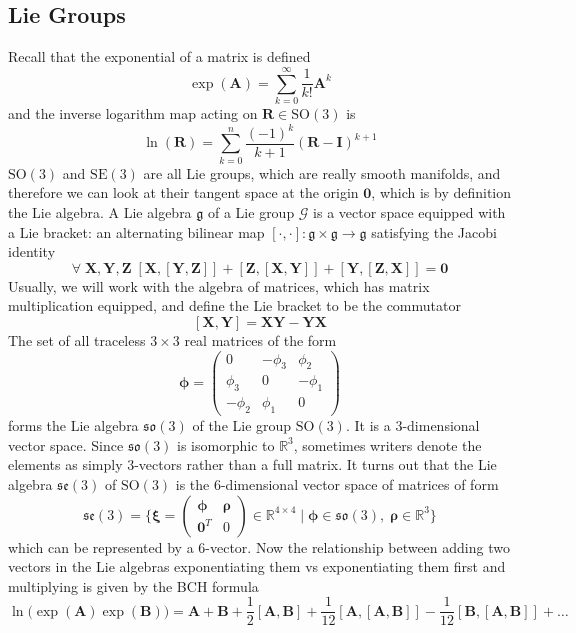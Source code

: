 \documentclass{article}
\theoremstyle{definition}
\theoremstyle{remark}
\theoremstyle{definition}
\begin{document}
\subsection{Lie Groups}

Recall that the exponential of a matrix is defined 
\[\exp(\mathbf{A}) = \sum_{k=0}^\infty \frac{1}{k!} \mathbf{A}^k\]
and the inverse logarithm map acting on $\mathbf{R} \in \mathrm{SO}(3)$ is 
\[\ln(\mathbf{R}) = \sum_{k=0}^n \frac{(-1)^k}{k + 1} (\mathbf{R} - \mathbf{I})^{k+1}\]
$\mathrm{SO}(3)$ and $\mathrm{SE}(3)$ are all Lie groups, which are really smooth manifolds, and therefore we can look at their tangent space at the origin $\mathbf{0}$, which is by definition the Lie algebra. A Lie algebra $\mathfrak{g}$ of a Lie group $\mathcal{G}$ is a vector space equipped with a Lie bracket: an alternating bilinear map $[ \cdot, \cdot] : \mathfrak{g} \times \mathfrak{g} \longrightarrow \mathfrak{g}$ satisfying the Jacobi identity 
\[\forall \;  \mathbf{X}, \mathbf{Y}, \mathbf{Z} \; [\mathbf{X}, [\mathbf{Y}, \mathbf{Z}]] + [\mathbf{Z}, [\mathbf{X}, \mathbf{Y}]] + [\mathbf{Y}, [\mathbf{Z}, \mathbf{X}]] = \mathbf{0}\]
Usually, we will work with the algebra of matrices, which has matrix multiplication equipped, and define the Lie bracket to be the commutator 
\[[\mathbf{X}, \mathbf{Y}] = \mathbf{X} \mathbf{Y} - \mathbf{Y} \mathbf{X}\]
The set of all traceless $3 \times 3$ real matrices of the form
\[\boldsymbol{\phi} = \begin{pmatrix} 0 & - \phi_3 & \phi_2 \\ \phi_3 & 0 & -\phi_1 \\ - \phi_2 & \phi_1 & 0 \end{pmatrix}\]
forms the Lie algebra $\mathfrak{so}(3)$ of the Lie group $\mathrm{SO}(3)$. It is a $3$-dimensional vector space. Since $\mathfrak{so}(3)$ is isomorphic to $\mathbb{R}^3$, sometimes writers denote the elements as simply $3$-vectors rather than a full matrix. It turns out that the Lie algebra $\mathfrak{se}(3)$ of $\mathrm{SO}(3)$ is the $6$-dimensional vector space of matrices of form
\[\mathfrak{se}(3) = \bigg\{ \boldsymbol{\xi} = \begin{pmatrix} \boldsymbol{\phi} & \boldsymbol{\rho} \\ \mathbf{0}^T & 0 \end{pmatrix} \in \mathbb{R}^{4 \times 4} \; \bigg| \; \boldsymbol{\phi} \in \mathfrak{so}(3), \; \boldsymbol{\rho} \in \mathbb{R}^3 \bigg\}\]
which can be represented by a $6$-vector. Now the relationship between adding two vectors in the Lie algebras exponentiating them vs exponentiating them first and multiplying is given by the BCH formula 
\[\ln\big( \exp(\mathbf{A}) \exp(\mathbf{B}) \big) = \mathbf{A} + \mathbf{B} + \frac{1}{2} [ \mathbf{A}, \mathbf{B}] + \frac{1}{12} [ \mathbf{A}, [\mathbf{A}, \mathbf{B}]] - \frac{1}{12} [\mathbf{B}, [\mathbf{A}, \mathbf{B}]] + \ldots\]
\end{document}
